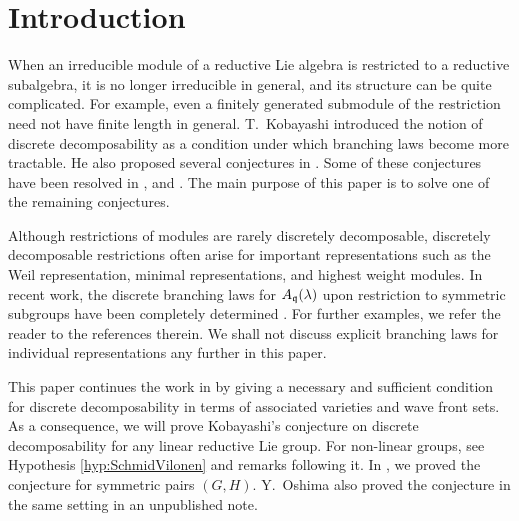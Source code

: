 

\begin{abstract}
	In this paper, we study when the restriction of an irreducible representation of a reductive Lie group $G$ to a reductive subgroup $H$ is discretely decomposable.
	T.\ Kobayashi gave a necessary condition for discrete decomposability in terms of associated varieties.
	In a previous paper, we proved that the condition is also sufficient if $(G, H)$ is a symmetric pair.
	The purpose of this paper is to prove the sufficiency for any reductive subgroup $H$ under some hypothesis on $G$ (e.g., $G$ is linear).
	As an application, we show that discrete decomposability is equivalent to $\mathfrak{h}$-admissibility when the compact factor of $\mathfrak{h}$ is maximal in some sense.
\end{abstract}

\section{Introduction}

When an irreducible module of a reductive Lie algebra is restricted to a reductive subalgebra, it is no longer irreducible in general, and its structure can be quite complicated.
For example, even a finitely generated submodule of the restriction need not have finite length in general.
T.\ Kobayashi \cite{Ko94, Ko98_discrete_decomposable_2, Ko98_discrete_decomposable_3} introduced the notion of discrete decomposability as a condition under which branching laws become more tractable.
He also proposed several conjectures in \cite{Ko00_discretely_decomposable,Ko11,Ko15_vogan}.
Some of these conjectures have been resolved in \cite{ZhLi10}, \cite{Ko19_admissible} and \cite{Ki24}.
The main purpose of this paper is to solve one of the remaining conjectures.

Although restrictions of modules are rarely discretely decomposable, discretely decomposable restrictions often arise for important representations such as the Weil representation, minimal representations, and highest weight modules.
In recent work, the discrete branching laws for $A_{\mathfrak{q}}(\lambda)$ upon restriction to symmetric subgroups have been completely determined \cite{Os25}.
For further examples, we refer the reader to the references therein.
We shall not discuss explicit branching laws for individual representations any further in this paper.

This paper continues the work in \cite{Ki24} by giving a necessary and sufficient condition for discrete decomposability in terms of associated varieties and wave front sets.
As a consequence, we will prove Kobayashi's conjecture \cite[Conjecture B]{Ko00_discretely_decomposable} on discrete decomposability for any linear reductive Lie group.
For non-linear groups, see Hypothesis \ref{hyp:SchmidVilonen} and remarks following it.
In \cite{Ki24}, we proved the conjecture for symmetric pairs $(G,H)$.
Y.\ Oshima also proved the conjecture in the same setting in an unpublished note.

